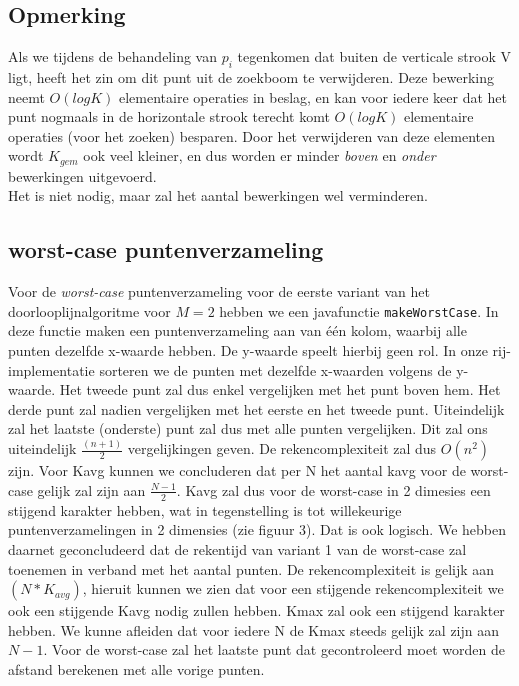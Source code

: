\documentclass[12pt]{article}
\begin{document}
\subsection{Opmerking}
Als we tijdens de behandeling van $p_i$ tegenkomen dat buiten de verticale
strook V ligt, heeft het zin om dit punt uit de zoekboom te verwijderen. Deze bewerking neemt
$O(logK)$ elementaire operaties in beslag, en kan voor iedere keer dat het punt nogmaals in de horizontale strook terecht komt $O(logK)$ elementaire operaties (voor het zoeken) besparen. Door het verwijderen van deze elementen wordt $K_{gem}$ ook veel kleiner, en dus worden er minder \textit{boven} en \textit{onder} bewerkingen uitgevoerd. \\
Het is niet nodig, maar zal het aantal bewerkingen wel verminderen.

\subsection{worst-case puntenverzameling}

Voor de \textit{worst-case} puntenverzameling voor de eerste variant van het doorlooplijnalgoritme voor $M = 2$ hebben we een javafunctie \texttt{makeWorstCase}.
In deze functie maken een puntenverzameling aan van één kolom, waarbij alle punten dezelfde x-waarde hebben.
De y-waarde speelt hierbij geen rol.
In onze rij-implementatie sorteren we de punten met dezelfde x-waarden volgens de y-waarde.
Het tweede punt zal dus enkel vergelijken met het punt boven hem.
Het derde punt zal nadien vergelijken met het eerste en het tweede punt.
Uiteindelijk zal het laatste (onderste) punt zal dus met alle punten vergelijken.
Dit zal ons uiteindelijk $\frac{(n+1)}{2}$ vergelijkingen geven. De rekencomplexiteit zal dus $O(n^2)$ zijn.
Voor Kavg kunnen we concluderen dat per N het aantal kavg voor de worst-case gelijk zal zijn aan $\frac{N-1}{2}$.
Kavg zal dus voor de worst-case in 2 dimesies een stijgend karakter hebben, wat in tegenstelling is tot willekeurige puntenverzamelingen in 2 dimensies (zie figuur 3).
Dat is ook logisch. We hebben daarnet geconcludeerd dat de rekentijd van variant 1 van de worst-case zal toenemen in verband met het aantal punten.
De rekencomplexiteit is gelijk aan $(N*K_{avg})$, hieruit kunnen we zien dat voor een stijgende rekencomplexiteit we ook een stijgende Kavg nodig zullen hebben.
Kmax zal ook een stijgend karakter hebben. We kunne afleiden dat voor iedere N de Kmax steeds gelijk zal zijn aan $N-1$.
Voor de worst-case zal het laatste punt dat gecontroleerd moet worden de afstand berekenen met alle vorige punten.
\end{document}
